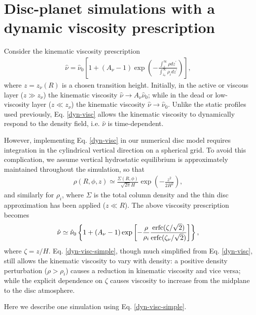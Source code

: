 \section{Disc-planet simulations with a dynamic viscosity
  prescription}
Consider the kinematic viscosity prescription 
\begin{align}\label{dyn-visc}
  \hat{\nu} = \hat{\nu}_0\left[1 + \left(A_\nu -
  1\right)\exp{\left(-\frac{\int_z^\infty\rho
        dz^\prime}{\int_{z_\nu}^\infty\rho_i dz^\prime}\right)}\right],  
\end{align}
where $z=z_\nu(R)$ is a chosen transition height. Initially, in the active
or viscous layer ($z\gg z_\nu$) the kinematic viscosity $\hat{\nu}\to
A_\nu\hat{\nu}_0$; while in the dead or low-viscosity layer ($z\ll
z_\nu$) the kinematic viscosity $\hat{\nu}\to\hat{\nu}_0$. Unlike the
static profiles used previously, Eq. \ref{dyn-visc} allows the
kinematic viscosity to dynamically respond to the density
field, i.e. $\hat{\nu}$ is time-dependent.  

However, implementing Eq. \ref{dyn-visc} in our numerical disc model
requires integration in the cylindrical vertical direction on a
spherical grid. To avoid this complication, we  
assume vertical hydrostatic equilibrium is approximately maintained 
throughout the simulation, so that 
\begin{align}
  \rho(R,\phi, z) \simeq
  \frac{\Sigma(R,\phi)}{\sqrt{2\pi}H}\exp{\left(-\frac{z^2}{2H^2}\right)},  
\end{align}
and similarly for $\rho_i$, where $\Sigma$ is the total column
density and the thin disc approximation has been applied ($z\ll R$). 
The above viscosity prescription becomes
\begin{align}\label{dyn-visc-simple}
   \hat{\nu} \simeq \hat{\nu}_0\left\{1 + \left(A_\nu -
  1\right)\exp{\left[-\frac{\rho}{\rho_i}\frac{\operatorname{erfc}(\zeta/\sqrt{2})}{\operatorname{erfc}(\zeta_\nu/\sqrt{2})}\right]}\right\},
\end{align} 
where $\zeta = z/H$. Eq. \ref{dyn-visc-simple}, though much simplified
from  Eq. \ref{dyn-visc}, still allows the kinematic 
viscosity to vary with density: a
positive density perturbation ($\rho>\rho_i$) causes a reduction in
kinematic viscosity and vice versa; while the explicit dependence on
$\zeta$ causes viscosity to increase from the midplane to the disc
atmosphere.    

Here we describe one simulation using Eq. \ref{dyn-visc-simple}. 
